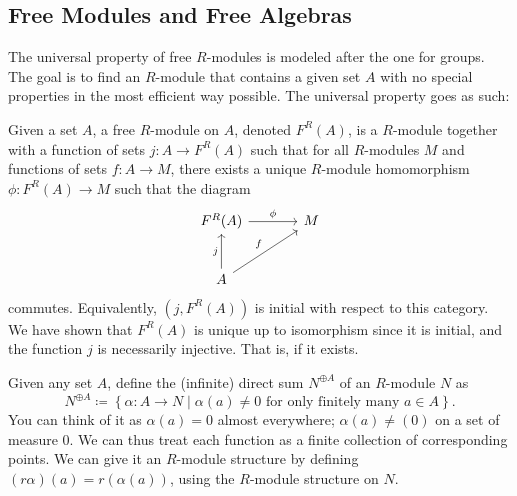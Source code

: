 \subsection{Free Modules and Free Algebras}
The universal property of free $R$-modules is modeled after the one for groups. The goal is to find an $R$-module that contains a given set $A$ with no special properties in the most efficient way possible. The universal property goes as such:

Given a set $A$, a free $R$-module on $A$, denoted $F^R(A)$, is a $R$-module together with a function of sets $j: A \to F^R(A)$ such that for all $R$-modules $M$ and functions of sets $f : A \to M$, there exists a unique $R$-module homomorphism $\phi : F^R(A) \to M$ such that the diagram
\[\begin{tikzcd}[row sep=2.5em, column sep=3.5em]
	F^R(A)\arrow[r, "\phi "]&M\\
	A\arrow[u, "j"]\arrow[ru, "f"]
\end{tikzcd}\]
commutes. Equivalently, $(j,F^R(A))$ is initial with respect to this category. We have shown that $F^R(A)$ is unique up to isomorphism since it is initial, and the function $j$ is necessarily injective. That is, if it exists.

Given any set $A$, define the (infinite) direct sum $N ^{\oplus A}$ of an $R$-module $N$ as
\[
	N ^{\oplus A}\coloneqq \left\{ \alpha : A \to N  \mid \alpha (a)\neq 0 \text{ for only finitely many }a\in A \right\} 
.\]
You can think of it as $\alpha (a)=0$ almost everywhere; $\alpha(a) \neq (0)$ on a set of measure 0. We can thus treat each function as a finite collection of corresponding points. We can give it an $R$-module structure by defining $(r\alpha )(a)=r(\alpha (a))$, using the $R$-module structure on $N$.

